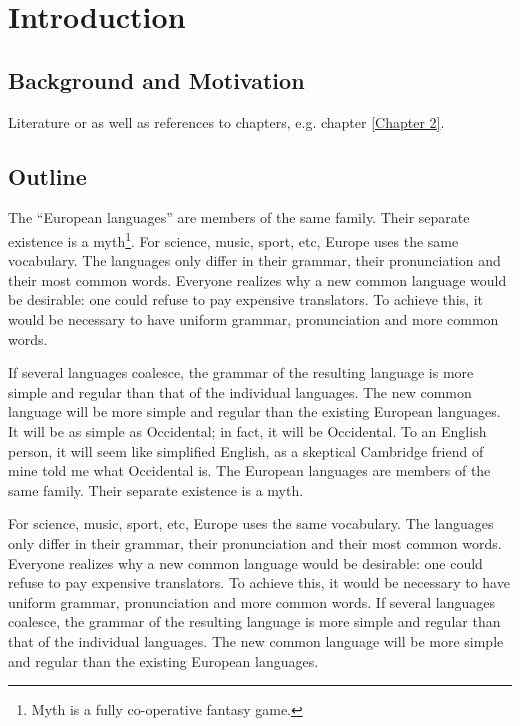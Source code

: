 
\chapter{Introduction}
\label{Introduction}

\section{Background and Motivation}
\label{Background_and_Motivation}
%
Literature \cite{Abramowski:1991} or \cite{Abramowski:1991, Muller:2011} as well as references to chapters, e.g. chapter \ref{Chapter 2}.\\






\section{Outline}
\label{Outline}
%
The \enquote{European languages} are members of the same family. Their separate existence is a myth\footnote{Myth is a fully co-operative fantasy game.}. For science, music, sport, etc, Europe uses the same vocabulary. The languages only differ in their grammar, their pronunciation and their most common words. Everyone realizes why a new common language would be desirable: one could refuse to pay expensive translators. To achieve this, it would be necessary to have uniform grammar, pronunciation and more common words.

If several languages coalesce, the grammar of the resulting language is more simple and regular than that of the individual languages. The new common language will be more simple and regular than the existing European languages. It will be as simple as Occidental; in fact, it will be Occidental. To an English person, it will seem like simplified English, as a skeptical Cambridge friend of mine told me what Occidental is. The European languages are members of the same family. Their separate existence is a myth.

For science, music, sport, etc, Europe uses the same vocabulary. The languages only differ in their grammar, their pronunciation and their most common words. Everyone realizes why a new common language would be desirable: one could refuse to pay expensive translators. To achieve this, it would be necessary to have uniform grammar, pronunciation and more common words. If several languages coalesce, the grammar of the resulting language is more simple and regular than that of the individual languages. The new common language will be more simple and regular than the existing European languages.


